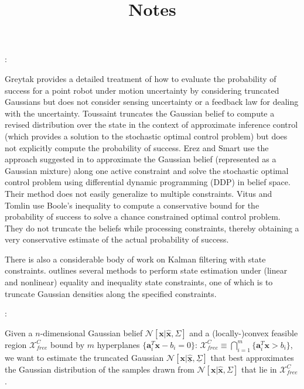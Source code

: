 \documentclass[letterpaper]{article}
\begin{document}
\title{\vspace{-40pt} Notes}

\author{}
\date{}

\maketitle

\vspace{-20pt}
: 

Greytak \cite{Greytak09} provides a detailed treatment of how to evaluate the probability of success for a point robot under motion uncertainty by considering truncated Gaussians but does not consider sensing uncertainty or a feedback law for dealing with the uncertainty. Toussaint \cite{Toussaint09b} truncates the Gaussian belief to compute a revised distribution over the state in the context of approximate inference control (which provides a solution to the stochastic optimal control problem) but does not explicitly compute the probability of success. Erez and Smart \cite{Erez10} use the approach suggested in \cite{Toussaint09b} to approximate the Gaussian belief (represented as a Gaussian mixture) along one active constraint and solve the stochastic optimal control problem using differential dynamic programming (DDP) in belief space. Their method does not easily generalize to multiple constraints. Vitus and Tomlin \cite{Vitus11} use Boole's inequality to compute a conservative bound for the probability of success to solve a chance constrained optimal control problem. They do not truncate the beliefs while processing constraints, thereby obtaining a very conservative estimate of the actual probability of success.

There is also a considerable body of work on Kalman filtering with state constraints. \cite{Simon09} outlines several methods to perform state estimation under (linear and nonlinear) equality and inequality state constraints, one of which is to truncate Gaussian densities along the specified constraints.

\vspace{10pt}
: 

Given a $n$-dimensional Gaussian belief $\mathcal{N}[\mathbf{x}|\hat{\mathbf{x}}, \Sigma]$ and a (locally-)convex feasible region $\mathcal{X}_{free}^{C}$ bound by $m$ hyperplanes $\{\mathbf{a}_{i}^T \mathbf{x} - b_{i} = 0\}$: $\mathcal{X}_{free}^{C} \equiv \bigcap \limits_{i = 1}^{m} {\{\mathbf{a}_{i}^T \mathbf{x} > b_{i}\}}$, we want to estimate the truncated Gaussian $\mathcal{N}[\mathbf{x}|\underline{\hat{\mathbf{x}}}, \underline{\Sigma}]$ that best approximates the Gaussian distribution of the samples drawn from $\mathcal{N}[\mathbf{x}|\hat{\mathbf{x}}, \Sigma]$ that lie in $\mathcal{X}_{free}^{C}$.
\end{document}
